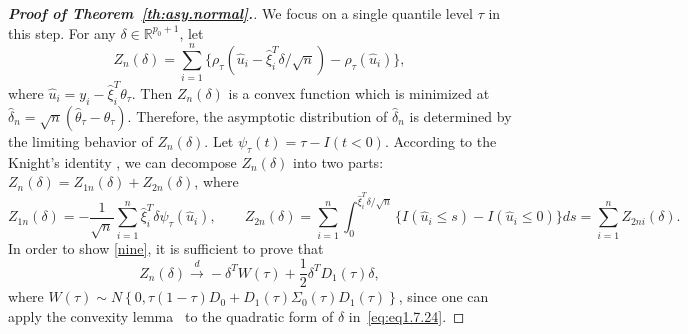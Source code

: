 \documentclass[times,sort&compress,3p]{elsarticle}
\theoremstyle{plain}%
\theoremstyle{definition}
\newcommand{\bD}{{D}}
\newcommand{\bW}{{W}}
\newcommand{\btheta}{{\theta}}
\newcommand{\bxi}{{\xi}}
\begin{document}
\begin{proof}[\textbf{\upshape Proof of Theorem~\ref{th:asy.normal}.}]
We focus on a single quantile level $\tau$ in this step. For any ${\delta} \in \mathbb{R}^{p_0 + 1}$, let 
\begin{equation}
\label{eq:Zn}
Z_n({\delta}) = \sum_{i = 1}^n \{ \rho_\tau(\widehat{u}_i - \widehat{\bxi}_i^T {\delta}/\sqrt{n}) - \rho_\tau(\widehat{u}_i) \},
\end{equation}
where $\widehat{u}_i = y_i - \widehat{\bxi}_i^T \btheta_{\tau}$. Then $Z_n({\delta})$ is a convex function which is minimized at $\widehat{{\delta}}_n =
\sqrt{n}(\widehat{\btheta}_{\tau}- \btheta_{\tau})$. Therefore, the asymptotic distribution of $\widehat{{\delta}}_n$ is determined by the limiting behavior of $Z_n({\delta})$. 
Let $\psi_\tau(t)=\tau - I(t < 0)$. According to the Knight's identity  \citep{knight}, we can decompose $Z_n({\delta})$ into two parts: $Z_n({\delta}) = Z_{1n}({\delta}) + Z_{2n}({\delta})$, where 
\begin{equation}
\label{eq:z1n}
Z_{1n}({\delta}) = -\frac{1}{\sqrt{n}} \sum_{i = 1}^n \widehat{\bxi}_i^T {\delta} \psi_\tau(\widehat{u}_i), \quad \quad 
Z_{2n}({\delta}) = \sum_{i = 1}^n \int_{0}^{ \widehat{\bxi}_i^T {\delta}/\sqrt{n}}\{ I(\widehat{u}_i \leq s) - I(\widehat{u}_i
\leq 0)\}ds = \sum_{i = 1}^n Z_{2ni}({\delta}).
\end{equation}
In order to show  \eqref{nine}, it is sufficient to prove that 
\begin{equation}
\label{eq:eq1.7.24}
Z_n({\delta}) \overset{d}{\rightarrow} -{\delta}^T W(\tau) + 
\frac{1}{2} {\delta}^T \bD_1 (\tau) {\delta},
\end{equation}
where $\bW(\tau) \sim N\left\{0, \tau(1 - \tau)\bD_0 + \bD_1(\tau) {\Sigma}_0(\tau) \bD_1(\tau)\right\}$, since one can apply the convexity lemma~\citep{pollard1991} to the quadratic form of $\delta$ in~\eqref{eq:eq1.7.24}. 


\end{proof}
\end{document}
